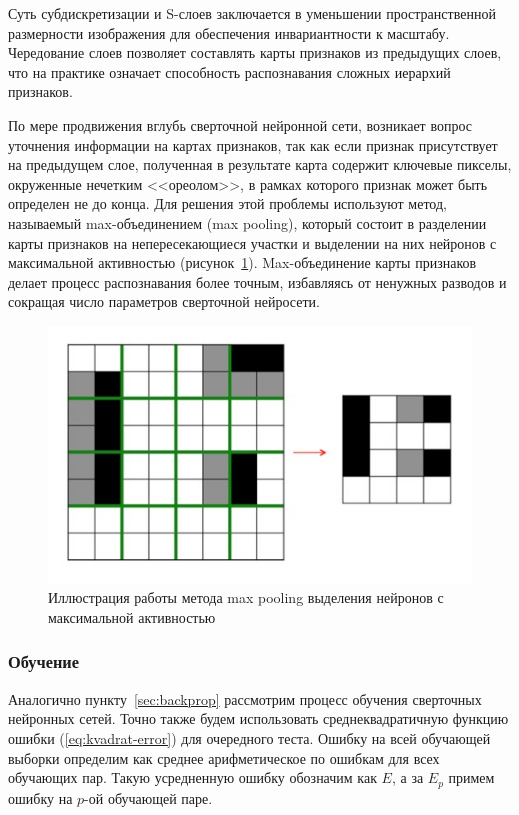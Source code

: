 \documentclass[a4paper,14pt]{extarticle} %
\begin{document}
Суть субдискретизации и S-слоев заключается в уменьшении пространственной размерности изображения для обеспечения инвариантности к масштабу. Чередование слоев позволяет составлять карты признаков из предыдущих слоев, что на практике означает способность распознавания сложных иерархий признаков.

По мере продвижения вглубь сверточной нейронной сети, возникает вопрос уточнения информации на картах признаков, так как если признак присутствует на предыдущем слое, полученная в результате карта содержит ключевые пикселы, окруженные нечетким <<ореолом>>, в рамках которого признак может быть определен не до конца. Для решения этой проблемы используют метод, называемый max-объединением (max pooling), который состоит в разделении карты признаков на непересекающиеся участки и выделении на них нейронов с максимальной активностью (рисунок~\ref{fig:max-pooling}). Max-объединение карты признаков делает процесс распознавания более точным, избавляясь от ненужных разводов и сокращая число параметров сверточной нейросети.

\begin{figure}[h]
\centering
\includegraphics[width=0.7\linewidth]{pictures/max-pooling}
\caption{Иллюстрация работы метода max pooling выделения нейронов с максимальной активностью}
\label{fig:max-pooling}
\end{figure}

\subsubsection{Обучение}
\hspace{\parindent} Аналогично пункту~\ref{sec:backprop} рассмотрим процесс обучения сверточных нейронных сетей. Точно также будем использовать среднеквадратичную функцию ошибки (\ref{eq:kvadrat-error}) для очередного теста. Ошибку на всей обучающей выборки определим как среднее арифметическое по ошибкам для всех обучающих пар. Такую усредненную ошибку обозначим как $E$, а за $E_p$ примем ошибку на $p$-ой обучающей паре.
\end{document}
